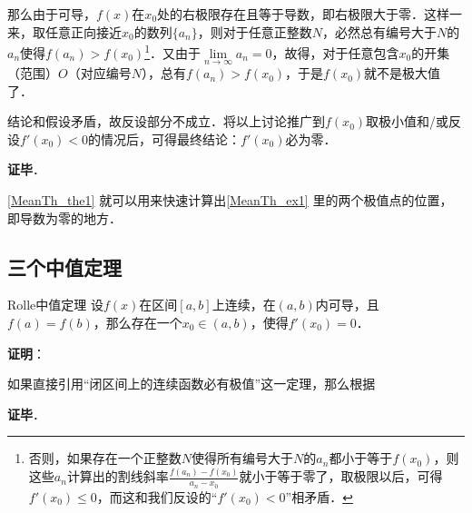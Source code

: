那么由于可导，$f(x)$在$x_0$处的右极限存在且等于导数，即右极限大于零．这样一来，取任意正向接近$x_0$的数列$\{a_n\}$，则对于任意正整数$N$，必然总有编号大于$N$的$a_n$使得$f(a_n)>f(x_0)$\footnote{否则，如果存在一个正整数$N$使得所有编号大于$N$的$a_n$都小于等于$f(x_0)$，则这些$a_n$计算出的割线斜率$\frac{f(a_n)-f(x_0)}{a_n-x_0}$就小于等于零了，取极限以后，可得$f'(x_0)\leq 0$，而这和我们反设的“$f'(x_0)<0$”相矛盾．}．又由于$\lim\limits_{n\to\infty}a_n=0$，故得，对于任意包含$x_0$的开集（范围）$O$（对应编号$N$），总有$f(a_n)>f(x_0)$，于是$f(x_0)$就不是极大值了．

结论和假设矛盾，故反设部分不成立．将以上讨论推广到$f(x_0)$取极小值和/或反设$f'(x_0)<0$的情况后，可得最终结论：$f'(x_0)$必为零．

\textbf{证毕}．

\autoref{MeanTh_the1} 就可以用来快速计算出\autoref{MeanTh_ex1} 里的两个极值点的位置，即导数为零的地方．


\subsection{三个中值定理}


\begin{definition}{Rolle中值定理}
设$f(x)$在区间$[a, b]$上连续，在$(a, b)$内可导，且$f(a)=f(b)$，那么存在一个$x_0\in(a, b)$，使得$f'(x_0)=0$．
\end{definition}


\textbf{证明}：

如果直接引用“闭区间上的连续函数必有极值”这一定理，那么根据

\textbf{证毕}．














